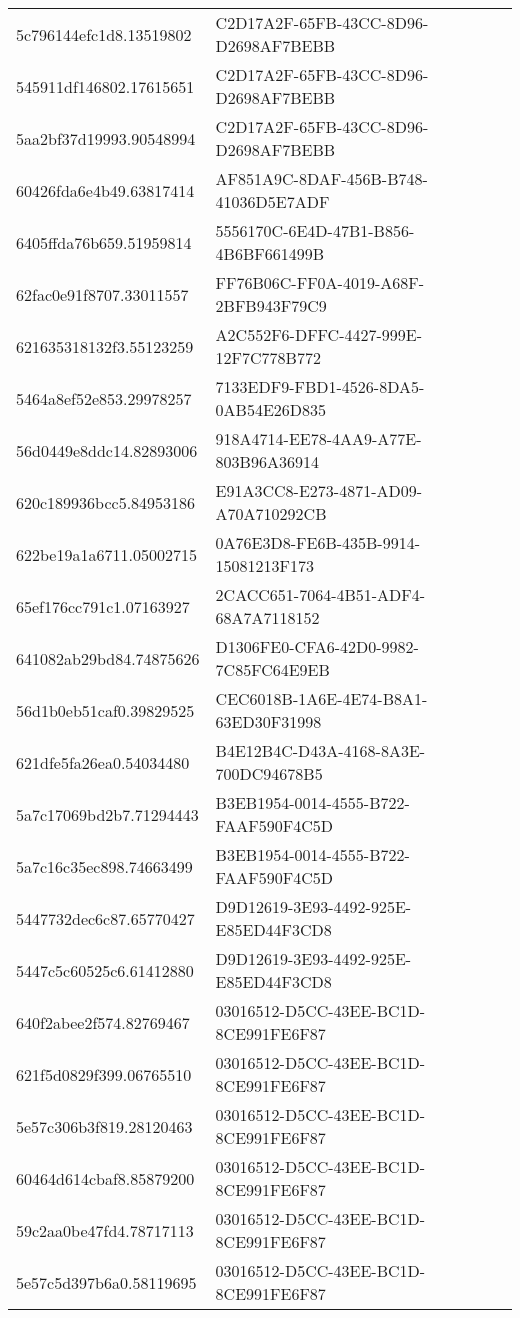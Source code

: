 \begin{tabular}{ll}
5c796144efc1d8.13519802 & C2D17A2F-65FB-43CC-8D96-D2698AF7BEBB \\
545911df146802.17615651 & C2D17A2F-65FB-43CC-8D96-D2698AF7BEBB \\
5aa2bf37d19993.90548994 & C2D17A2F-65FB-43CC-8D96-D2698AF7BEBB \\
60426fda6e4b49.63817414 & AF851A9C-8DAF-456B-B748-41036D5E7ADF \\
6405ffda76b659.51959814 & 5556170C-6E4D-47B1-B856-4B6BF661499B \\
62fac0e91f8707.33011557 & FF76B06C-FF0A-4019-A68F-2BFB943F79C9 \\
621635318132f3.55123259 & A2C552F6-DFFC-4427-999E-12F7C778B772 \\
5464a8ef52e853.29978257 & 7133EDF9-FBD1-4526-8DA5-0AB54E26D835 \\
56d0449e8ddc14.82893006 & 918A4714-EE78-4AA9-A77E-803B96A36914 \\
620c189936bcc5.84953186 & E91A3CC8-E273-4871-AD09-A70A710292CB \\
622be19a1a6711.05002715 & 0A76E3D8-FE6B-435B-9914-15081213F173 \\
65ef176cc791c1.07163927 & 2CACC651-7064-4B51-ADF4-68A7A7118152 \\
641082ab29bd84.74875626 & D1306FE0-CFA6-42D0-9982-7C85FC64E9EB \\
56d1b0eb51caf0.39829525 & CEC6018B-1A6E-4E74-B8A1-63ED30F31998 \\
621dfe5fa26ea0.54034480 & B4E12B4C-D43A-4168-8A3E-700DC94678B5 \\
5a7c17069bd2b7.71294443 & B3EB1954-0014-4555-B722-FAAF590F4C5D \\
5a7c16c35ec898.74663499 & B3EB1954-0014-4555-B722-FAAF590F4C5D \\
5447732dec6c87.65770427 & D9D12619-3E93-4492-925E-E85ED44F3CD8 \\
5447c5c60525c6.61412880 & D9D12619-3E93-4492-925E-E85ED44F3CD8 \\
640f2abee2f574.82769467 & 03016512-D5CC-43EE-BC1D-8CE991FE6F87 \\
621f5d0829f399.06765510 & 03016512-D5CC-43EE-BC1D-8CE991FE6F87 \\
5e57c306b3f819.28120463 & 03016512-D5CC-43EE-BC1D-8CE991FE6F87 \\
60464d614cbaf8.85879200 & 03016512-D5CC-43EE-BC1D-8CE991FE6F87 \\
59c2aa0be47fd4.78717113 & 03016512-D5CC-43EE-BC1D-8CE991FE6F87 \\
5e57c5d397b6a0.58119695 & 03016512-D5CC-43EE-BC1D-8CE991FE6F87 \\

\end{tabular}
